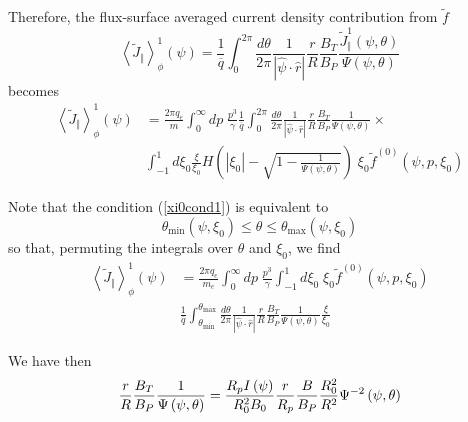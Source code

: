 Therefore, the flux-surface averaged current density contribution from $%
\widetilde{f}$
\begin{equation}
\left\langle \widetilde{J}_{\Vert}\right\rangle _{\phi}^{1}\left(
\psi\right) =\frac{1}{\overline{q}}\int_{0}^{2\pi}\frac{d\theta}{2\pi}\frac{1%
}{\left| \widehat{\psi}\cdot\widehat{r}\right| }\frac{r}{R}\frac{B_{T}}{
B_{P}}\frac{\widetilde{J}_{\Vert}^{1}\left( \psi,\theta\right) }{\Psi\left(
\psi,\theta\right) }
\end{equation}
becomes
\begin{align}
\left\langle \widetilde{J}_{\Vert}\right\rangle _{\phi}^{1}\left(
\psi\right) & =\frac{2\pi q_{e}}{m}\int_{0}^{\infty}dp\;\frac{p^{3}}{\gamma }%
\frac{1}{\overline{q}}\int_{0}^{2\pi}\frac{d\theta}{2\pi}\frac{1}{\left|
\widehat{\psi}\cdot\widehat{r}\right| }\frac{r}{R}\frac{B_{T}}{B_{P}}\frac
{1}{\Psi\left( \psi,\theta\right) }\times  \nonumber \\
& \int_{-1}^{1}d\xi_{0}\frac{\xi}{\xi_{0}}H\left( \left| \xi_{0}\right| -%
\sqrt{1-\frac{1}{\Psi\left( \psi,\theta\right) }}\right) \;\xi _{0}%
\widetilde{f}^{(0)}\left( \psi,p,\xi_{0}\right)
\end{align}

Note that the condition (\ref{xi0cond1}) is equivalent to
\begin{equation}
\theta_{\min}\left( \psi,\xi_{0}\right) \leq\theta\leq\theta_{\max}\left(
\psi,\xi_{0}\right)
\end{equation}
so that, permuting the integrals over $\theta$ and $\xi_{0}$, we find
\begin{align}
\left\langle \widetilde{J}_{\Vert}\right\rangle _{\phi}^{1}\left(
\psi\right) & =\frac{2\pi q_{e}}{m_{e}}\int_{0}^{\infty}dp\;\frac{p^{3}}{
\gamma}\int_{-1}^{1}d\xi_{0}\;\xi_{0}\widetilde{f}^{(0)}\left( \psi
,p,\xi_{0}\right)  \nonumber \\
& \frac{1}{\overline{q}}\int_{\theta_{\min}}^{\theta_{\max}}\frac{d\theta }{
2\pi}\frac{1}{\left| \widehat{\psi}\cdot\widehat{r}\right| }\frac{r}{R}\frac{
B_{T}}{B_{P}}\frac{1}{\Psi\left( \psi,\theta\right) }\frac{\xi}{\xi_{0}}
\label{J1tilde}
\end{align}

We have then
\begin{equation}
\frac{r}{R}\frac{B_{T}}{B_{P}}\frac{1}{\Psi\left( \psi,\theta\right) }=\frac{%
R_{p}I\left( \psi\right) }{R_{0}^{2}B_{0}}\frac{r}{R_{p}}\frac{B}{ B_{P}}%
\frac{R_{0}^{2}}{R^{2}}\Psi^{-2}\left( \psi,\theta\right)
\end{equation}

